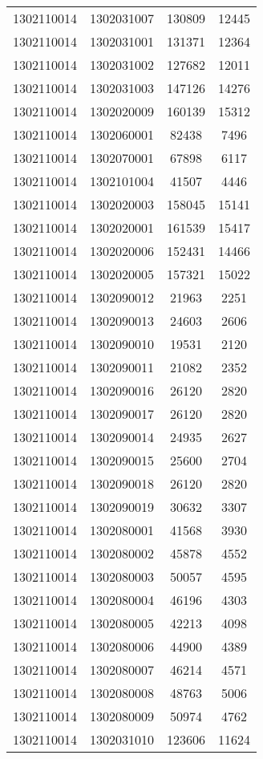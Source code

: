 \begin{longtable}[h]{llcc}
		1302110014 & 1302031007 & 130809 & 12445\\
		1302110014 & 1302031001 & 131371 & 12364\\
		1302110014 & 1302031002 & 127682 & 12011\\
		1302110014 & 1302031003 & 147126 & 14276\\
		1302110014 & 1302020009 & 160139 & 15312\\
		1302110014 & 1302060001 & 82438 & 7496\\
		1302110014 & 1302070001 & 67898 & 6117\\
		1302110014 & 1302101004 & 41507 & 4446\\
		1302110014 & 1302020003 & 158045 & 15141\\
		1302110014 & 1302020001 & 161539 & 15417\\
		1302110014 & 1302020006 & 152431 & 14466\\
		1302110014 & 1302020005 & 157321 & 15022\\
		1302110014 & 1302090012 & 21963 & 2251\\
		1302110014 & 1302090013 & 24603 & 2606\\
		1302110014 & 1302090010 & 19531 & 2120\\
		1302110014 & 1302090011 & 21082 & 2352\\
		1302110014 & 1302090016 & 26120 & 2820\\
		1302110014 & 1302090017 & 26120 & 2820\\
		1302110014 & 1302090014 & 24935 & 2627\\
		1302110014 & 1302090015 & 25600 & 2704\\
		1302110014 & 1302090018 & 26120 & 2820\\
		1302110014 & 1302090019 & 30632 & 3307\\
		1302110014 & 1302080001 & 41568 & 3930\\
		1302110014 & 1302080002 & 45878 & 4552\\
		1302110014 & 1302080003 & 50057 & 4595\\
		1302110014 & 1302080004 & 46196 & 4303\\
		1302110014 & 1302080005 & 42213 & 4098\\
		1302110014 & 1302080006 & 44900 & 4389\\
		1302110014 & 1302080007 & 46214 & 4571\\
		1302110014 & 1302080008 & 48763 & 5006\\
		1302110014 & 1302080009 & 50974 & 4762\\
		1302110014 & 1302031010 & 123606 & 11624\\

\end{longtable}
